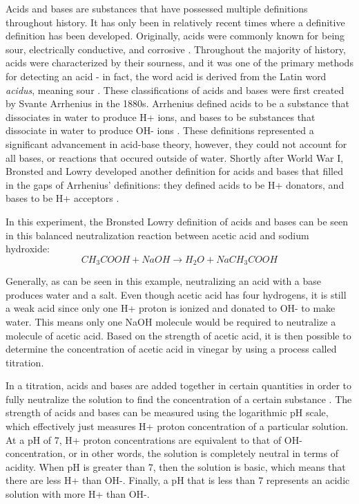 
Acids and bases are substances that have possessed multiple definitions throughout history. It has only been in relatively recent times where a definitive definition has been developed. Originally, acids were commonly known for being sour, electrically conductive, and corrosive \cite{story_bench--bedside_2004}. Throughout the majority of history, acids were characterized by their sourness, and it was one of the primary methods for detecting an acid - in fact, the word acid is derived from the Latin word \textit{acidus}, meaning sour \cite{story_bench--bedside_2004}. These classifications of acids and bases were first created by Svante Arrhenius in the 1880s. Arrhenius defined acids to be a substance that dissociates in water to produce H+ ions, and bases to be substances that dissociate in water to produce OH- ions \cite{noauthor_nobel_nodate}. These definitions represented a significant advancement in acid-base theory, however, they could not account for all bases, or reactions that occured outside of water. Shortly after World War I, Bronsted and Lowry developed another definition for acids and bases that filled in the gaps of Arrhenius' definitions: they defined acids to be H+ donators, and bases to be H+ acceptors \cite{story_bench--bedside_2004}.

In this experiment, the Bronsted Lowry definition of acids and bases can be seen in this balanced neutralization reaction between acetic acid and sodium hydroxide:
\[CH_{3}COOH + NaOH \rightarrow H_{2}O + NaCH_{3}COOH\]

Generally, as can be seen in this example, neutralizing an acid with a base produces water and a salt. Even though acetic acid has four hydrogens, it is still a weak acid since only one H+ proton is ionized and donated to OH- to make water. This means only one NaOH molecule would be required to neutralize a molecule of acetic acid. Based on the strength of acetic acid, it is then possible to determine the concentration of acetic acid in vinegar by using a process called titration. 

In a titration, acids and bases are added together in certain quantities in order to fully neutralize the solution to find the concentration of a certain substance \cite{noauthor_acid-base_2013}. The strength of acids and bases can be measured using the logarithmic pH scale, which effectively just measures H+ proton concentration of a particular solution. At a pH of 7, H+ proton concentrations are equivalent to that of OH- concentration, or in other words, the solution is completely neutral in terms of acidity. When pH is greater than 7, then the solution is basic, which means that there are less H+ than OH-. Finally, a pH that is less than 7 represents an acidic solution with more H+ than OH-. 

